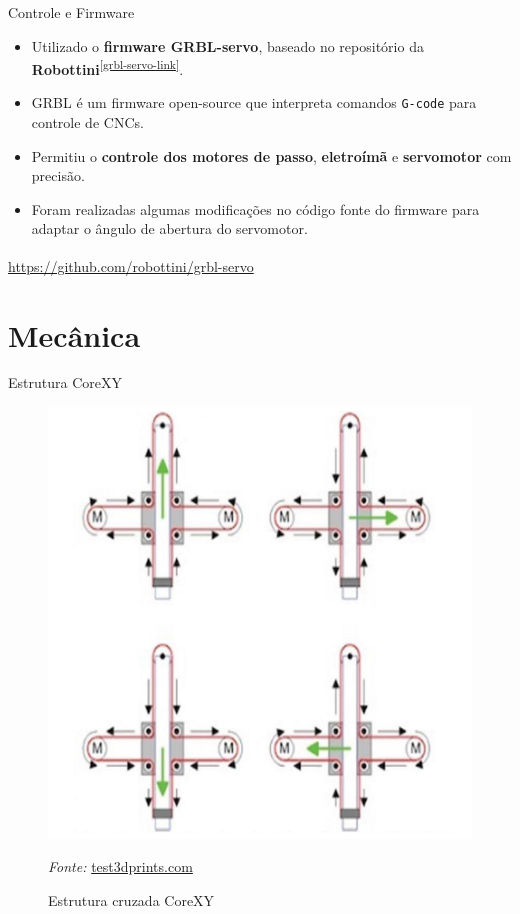 \documentclass{beamer}
\begin{document}
\begin{frame}{Controle e Firmware}
  \begin{itemize}
    \item Utilizado o \textbf{firmware GRBL-servo}, baseado no repositório da \textbf{Robottini}\textsuperscript{\ref{grbl-servo-link}}.
    \item GRBL é um firmware open-source que interpreta comandos \texttt{G-code} para controle de CNCs.
    \item Permitiu o \textbf{controle dos motores de passo}, \textbf{eletroímã} e \textbf{servomotor} com precisão.
    \item Foram realizadas algumas modificações no código fonte do firmware para adaptar o ângulo de abertura do servomotor.
  \end{itemize}

  \vfill
  \begin{flushright}
    \scriptsize \textsuperscript{\label{grbl-servo-link}\thefootnote} \href{https://github.com/robottini/grbl-servo}{https://github.com/robottini/grbl-servo}
  \end{flushright}
\end{frame}


\section{Mecânica}

\begin{frame}{Estrutura CoreXY}
  \begin{figure}
    \centering
    \includegraphics[width=0.5\linewidth]{images/corexy.png}
    \caption{Estrutura cruzada CoreXY}
      \vspace{0.3em}
  {\small \textit{Fonte:} \href{test3dprints.com}{test3dprints.com}}
    \label{fig:enter-label}
\end{figure}
\end{frame}
\end{document}
